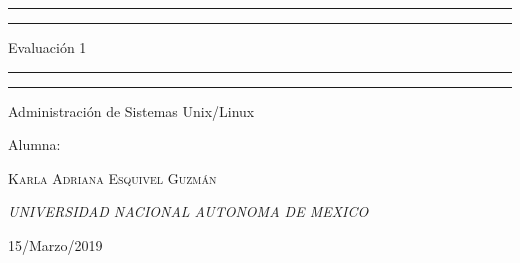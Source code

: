 \documentclass[a4paper, 11pt, oneside]{article}
\begin{document}
 

\begin{titlepage} 

	\centering 
	
	\scshape 
	
	\vspace*{\baselineskip} 
	
	
	
	\rule{\textwidth}{1.6pt}\vspace*{-\baselineskip}\vspace*{2pt} 
	\rule{\textwidth}{0.4pt} 
	
	\vspace{0.75\baselineskip} 
	
	{\LARGE Evaluación 1}	
	\vspace{0.75\baselineskip} 
	
	\rule{\textwidth}{0.4pt}\vspace*{-\baselineskip}\vspace{3.2pt}
	\rule{\textwidth}{1.6pt} 
	
	\vspace{2\baselineskip} 
	

	Administración de Sistemas Unix/Linux
	
	\vspace*{3\baselineskip} 
	
	
	
	Alumna:
	
	\vspace{0.5\baselineskip} 
	
	{\scshape\Large Karla Adriana Esquivel Guzmán \\} 
	\vspace{0.5\baselineskip} 
	\vfill

	
	\textit{UNIVERSIDAD NACIONAL AUTONOMA DE MEXICO} 
	
	\vfill
	
	
	
	
	\vspace{0.3\baselineskip} 
	
	15/Marzo/2019 
	
	 

\end{titlepage}
\end{document}
